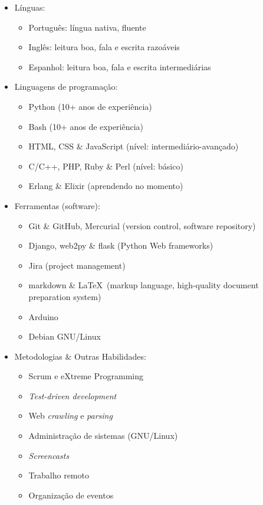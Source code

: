 \documentclass[a4paper,11pt]{article}
\begin{document}
	\begin{itemize}
		\item Línguas:
		\begin{itemize}
			\item Português: língua nativa, fluente
			\item Inglês: leitura boa, fala e escrita razoáveis
			\item Espanhol: leitura boa, fala e escrita intermediárias
		\end{itemize}
		\item Linguagens de programação:
		\begin{itemize}
			\item Python (10+ anos de experiência)
			\item Bash (10+ anos de experiência)
			\item HTML, CSS \& JavaScript (nível: intermediário-avançado)
			\item C/C++, PHP, Ruby \& Perl (nível: básico)
			\item Erlang \& Elixir (aprendendo no momento)
		\end{itemize}
		\item Ferramentas (software):
		\begin{itemize}
			\item Git \& GitHub, Mercurial (version control, software
				repository)
			\item Django, web2py \& flask (Python Web frameworks)
			\item Jira (project management)
			\item markdown \& \LaTeX\ (markup language, high-quality document
				preparation system)
			\item Arduino
			\item Debian GNU/Linux
		\end{itemize}
		\item Metodologias \& Outras Habilidades:
		\begin{itemize}
			\item Scrum e eXtreme Programming
			\item \textit{Test-driven development}
			\item Web \textit{crawling} e \textit{parsing}
			\item Administração de sistemas (GNU/Linux)
			\item \textit{Screencasts}
			\item Trabalho remoto
			\item Organização de eventos
		\end{itemize}
	\end{itemize}
\end{document}
